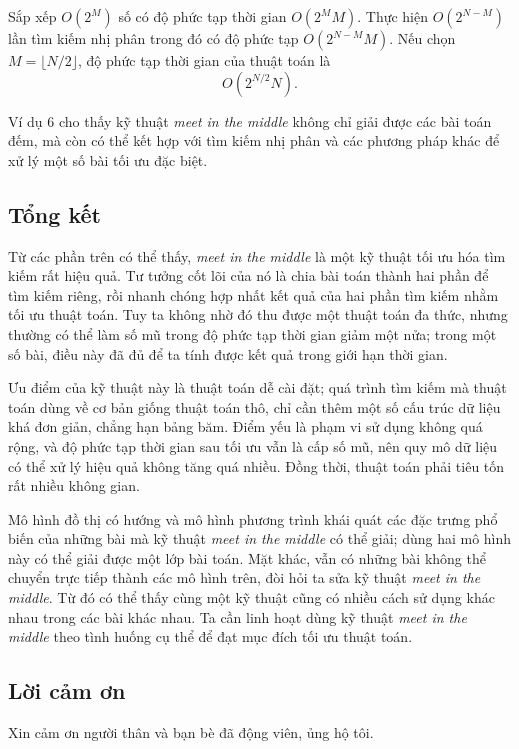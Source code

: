 \documentclass[11pt]{article}
\begin{document}
Sắp xếp \(O(2^M)\) số có độ phức tạp thời gian \(O(2^M M)\). Thực hiện
\(O(2^{N-M})\) lần tìm kiếm nhị phân trong đó có độ phức tạp
\(O(2^{N-M}M)\). Nếu chọn \(M=\lfloor N/2\rfloor\), độ phức tạp thời gian của
thuật toán là
\[
  O(2^{N/2}N).
\]

Ví dụ 6 cho thấy kỹ thuật \emph{meet in the middle} không chỉ giải được các
bài toán đếm, mà còn có thể kết hợp với tìm kiếm nhị phân và các phương pháp
khác để xử lý một số bài tối ưu đặc biệt.

\subsection{Tổng kết}

Từ các phần trên có thể thấy, \emph{meet in the middle} là một kỹ thuật tối
ưu hóa tìm kiếm rất hiệu quả. Tư tưởng cốt lõi của nó là chia bài toán thành
hai phần để tìm kiếm riêng, rồi nhanh chóng hợp nhất kết quả của hai phần tìm
kiếm nhằm tối ưu thuật toán. Tuy ta không nhờ đó thu được một thuật toán đa
thức, nhưng thường có thể làm số mũ trong độ phức tạp thời gian giảm một nửa;
trong một số bài, điều này đã đủ để ta tính được kết quả trong giới hạn thời
gian.

Ưu điểm của kỹ thuật này là thuật toán dễ cài đặt; quá trình tìm kiếm mà
thuật toán dùng về cơ bản giống thuật toán thô, chỉ cần thêm một số cấu trúc
dữ liệu khá đơn giản, chẳng hạn bảng băm. Điểm yếu là phạm vi sử dụng không
quá rộng, và độ phức tạp thời gian sau tối ưu vẫn là cấp số mũ, nên quy mô dữ
liệu có thể xử lý hiệu quả không tăng quá nhiều. Đồng thời, thuật toán phải
tiêu tốn rất nhiều không gian.

Mô hình đồ thị có hướng và mô hình phương trình khái quát các đặc trưng phổ
biến của những bài mà kỹ thuật \emph{meet in the middle} có thể giải; dùng
hai mô hình này có thể giải được một lớp bài toán. Mặt khác, vẫn có những bài
không thể chuyển trực tiếp thành các mô hình trên, đòi hỏi ta sửa kỹ thuật
\emph{meet in the middle}. Từ đó có thể thấy cùng một kỹ thuật cũng có nhiều
cách sử dụng khác nhau trong các bài khác nhau. Ta cần linh hoạt dùng kỹ
thuật \emph{meet in the middle} theo tình huống cụ thể để đạt mục đích tối ưu
thuật toán.

\subsection{Lời cảm ơn}

Xin cảm ơn người thân và bạn bè đã động viên, ủng hộ tôi.
\end{document}
